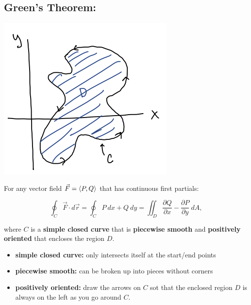 \subsection*{Green's Theorem:}




\includegraphics[width=\textwidth]{Ch13s4-GT.png}

\hspace*{.4in}

For any vector field \(\vec{F} = \left\langle P,Q\right\rangle\) that has continuous first partials:

\[
\oint_C \vec{F}\cdot d\vec{r} = \oint_C P\ dx + Q\ dy = \iint_D \frac{\partial Q}{\partial x} - \frac{\partial P}{\partial y} \ dA,
\]

where \(C\) is a \textbf{simple closed curve} that is \textbf{piecewise smooth} and \textbf{positively oriented} that encloses the region \(D\).

\begin{itemize}
\item \textbf{simple closed curve:} only intersects itself at the start/end points
\item \textbf{piecewise smooth:} can be broken up into pieces without corners
\item \textbf{positively oriented:} draw the arrows on \(C\) sot that the enclosed region \(D\) is always on the left as you go around \(C\).

\end{itemize}

